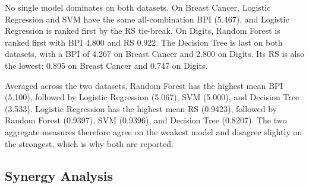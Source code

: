 \begin{table}[H]
\centering
\caption{Robustness ranking by BPI and RS.}
\label{tab:robustness}
\end{table}

No single model dominates on both datasets. On Breast Cancer, Logistic Regression and SVM have the same all-combination BPI (5.467), and Logistic Regression is ranked first by the RS tie-break. On Digits, Random Forest is ranked first with BPI 4.800 and RS 0.922. The Decision Tree is last on both datasets, with a BPI of 4.267 on Breast Cancer and 2.800 on Digits. Its RS is also the lowest: 0.895 on Breast Cancer and 0.747 on Digits.

Averaged across the two datasets, Random Forest has the highest mean BPI (5.100), followed by Logistic Regression (5.067), SVM (5.000), and Decision Tree (3.533). Logistic Regression has the highest mean RS (0.9423), followed by Random Forest (0.9397), SVM (0.9396), and Decision Tree (0.8207). The two aggregate measures therefore agree on the weakest model and disagree slightly on the strongest, which is why both are reported.

\subsection{Synergy Analysis}

